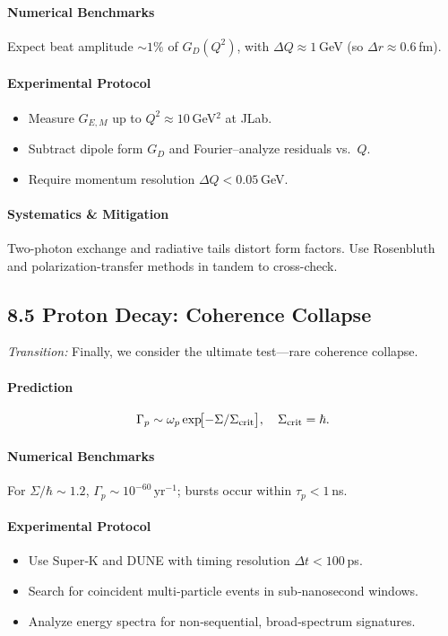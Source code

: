 \paragraph{Numerical Benchmarks}  
Expect beat amplitude \(\sim1\%\) of \(G_D(Q^2)\), with \(\Delta Q\approx1\) GeV (so \(\Delta r\approx0.6\) fm).

\paragraph{Experimental Protocol}  
\begin{itemize}
  \item Measure \(G_{E,M}\) up to \(Q^2\approx10\) GeV\(^2\) at JLab.  
  \item Subtract dipole form \(G_D\) and Fourier–analyze residuals vs.\ \(Q\).  
  \item Require momentum resolution \(\Delta Q<0.05\) GeV.
\end{itemize}

\paragraph{Systematics \& Mitigation}  
Two-photon exchange and radiative tails distort form factors.  Use Rosenbluth and polarization-transfer methods in tandem to cross-check.

\subsection{8.5 Proton Decay: Coherence Collapse}  
\emph{Transition:} Finally, we consider the ultimate test—rare coherence collapse.

\paragraph{Prediction}  
\begin{equation}\label{eq:decay_rate}
\Gamma_p \sim \omega_p \exp\!\bigl[-\Sigma/\Sigma_{\rm crit}\bigr], 
\quad \Sigma_{\rm crit}=\hbar.
\end{equation}

\paragraph{Numerical Benchmarks}  
For \(\Sigma/\hbar\sim1.2\), \(\Gamma_p\sim10^{-60}\,\mathrm{yr}^{-1}\); bursts occur within \(\tau_p<1\) ns.

\paragraph{Experimental Protocol}  
\begin{itemize}
  \item Use Super‐K and DUNE with timing resolution \(\Delta t<100\) ps.  
  \item Search for coincident multi‐particle events in sub‐nanosecond windows.  
  \item Analyze energy spectra for non‐sequential, broad‐spectrum signatures.
\end{itemize}

